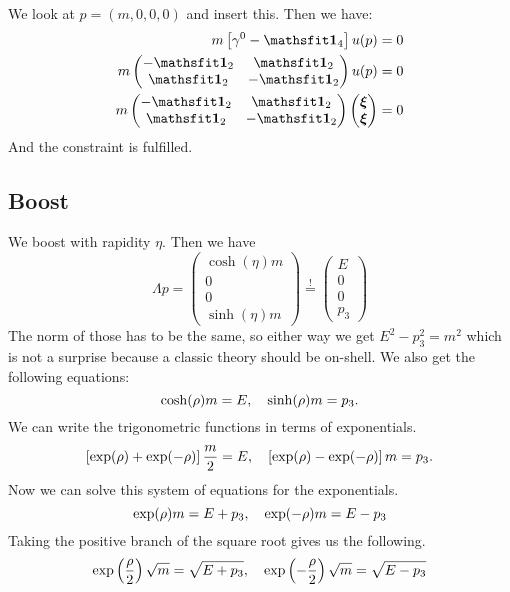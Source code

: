 \documentclass[11pt, english, fleqn, DIV=15, headinclude, BCOR=1cm]{scrartcl}
\begin{document}
We look at $p = (m, 0, 0, 0)$ and insert this. Then we have:
\begin{align*}
    m \sbr{\gamma^0 - \tens 1_4} u(p) &= 0 \\
    m \begin{pmatrix}
        - \tens 1_2 & \tens 1_2 \\ \tens 1_2 & - \tens 1_2
    \end{pmatrix} u(p) &= 0 \\
    m \begin{pmatrix}
        - \tens 1_2 & \tens 1_2 \\ \tens 1_2 & - \tens 1_2
    \end{pmatrix} \begin{pmatrix}
        \vec \xi \\ \vec \xi
    \end{pmatrix} &= 0
\end{align*}
And the constraint is fulfilled.

\subsection{Boost}

We boost with rapidity $\eta$. Then we have
\[
    \Lambda p = \begin{pmatrix}
        \cosh(\eta) m \\ 0 \\ 0 \\ \sinh(\eta) m
    \end{pmatrix}
    \overset != \begin{pmatrix}
        E \\ 0 \\ 0 \\ p_3
    \end{pmatrix}
\]
The norm of those has to be the same, so either way we get $E^2 - p_3^2 = m^2$
which is not a surprise because a classic theory should be on-shell. We also
get the following equations:
\[
    \cosh(\rho) m = E
    ,\quad
    \sinh(\rho) m = p_3.
\]
We can write the trigonometric functions in terms of exponentials.
\[
    \left[ \exp(\rho) + \exp(-\rho) \right] \frac m2 = E
    ,\quad
     \left[ \exp(\rho) - \exp(-\rho) \right]m = p_3.
\]
Now we can solve this system of equations for the exponentials.
\[
    \exp(\rho) m = E + p_3
    ,\quad
    \exp(-\rho) m = E - p_3
\]
Taking the positive branch of the square root gives us the following.
\[
    \exp\left( \frac\rho2 \right) \sqrt m = \sqrt{E + p_3}
    ,\quad
    \exp\left( -\frac\rho2 \right) \sqrt m = \sqrt{E - p_3}
\]
\end{document}

